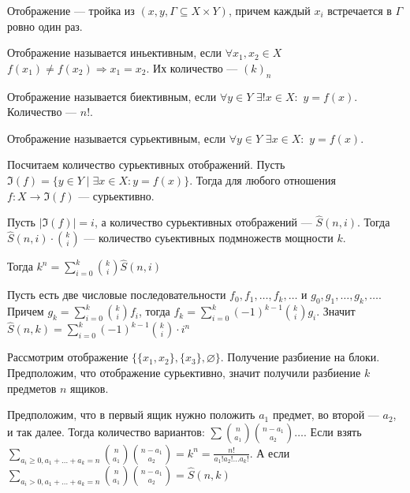  \begin{definition}
     Отображение --- тройка из $\left(x, y, \Gamma \subseteq X \times Y \right)$, причем каждый  $x_i$ встречается в $\Gamma$ ровно один раз. 
\end{definition}
 \begin{definition}
     Отображение называется иньективным, если $\forall x_1, x_2 \in X$ $f(x_1) \neq f(x_2) \Rightarrow x_1 = x_2$. Их количество --- $(k)_n$
 \end{definition}
 \begin{definition}
     Отображение называется биективным, если $\forall y \in Y$  $\exists! x \in X:$  $y = f(x)$. Количество --- $n!$.
 \end{definition}
 \begin{definition}
     Отображение называется сурьективным, если $\forall y \in Y$  $\exists x \in X:$  $y = f(x)$.
 \end{definition}
 
 Посчитаем количество сурьективных отображений. Пусть $\Im(f) = \{y \in Y \mid \exists x \in X: y = f(x)\}$. Тогда для любого отношения  $f: X \to \Im(f)$ --- сурьективно.

 Пусть $|\Im(f)| = i$, а количество сурьективных отображений ---  $\widehat{S}(n, i)$. Тогда  $\widehat{S}(n, i)\cdot\binom{k}{i}$ --- количество суьективных подмножеств мощности  $k$.

 Тогда  $k^n = \sum_{i=0}^k \binom{k}{i} \widehat{S}(n, i)$
 
 Пусть есть две числовые последовательности  $f_0, f_1,\ldots, f_k, \ldots$ и $g_0, g_1,\ldots, g_k, \ldots$. Причем $g_k = \sum_{i=0}^k \binom{k}{i} f_i$, тогда  $f_k = \sum_{i=0}^{k} (-1)^{k-1} \binom{k}{i}g_i$. Значит  $\widehat{S}(n, k) = \sum_{i=0}^k (-1)^{k-1} \binom{k}{i} \cdot i^n$ 

 Рассмотрим отображение  $\{\{x_1, x_2\}, \{x_3\}, \varnothing\}$. Получение разбиение на блоки. Предположим, что отображение сурьективно, значит получили разбиение $k$ предметов  $n$ ящиков. 

 Предположим, что в первый ящик нужно положить $a_1$ предмет, во второй ---  $a_2$,  и так далее. Тогда количество вариантов: $\sum \binom{n}{a_1}\binom{n-a_1}{a_2}\ldots$. Если взять $\sum_{a_i \ge 0, a_1+\ldots+a_k=n}\binom{n}{a_1}\binom{n-a_1}{a_2} = k^n = \frac{ n!}{a_1!a_2!\ldots a_k!}$. А если $\sum_{a_i > 0, a_1+\ldots+a_k=n}\binom{n}{a_1}\binom{n-a_1}{a_2} = \widehat{S}(n, k)$ 
